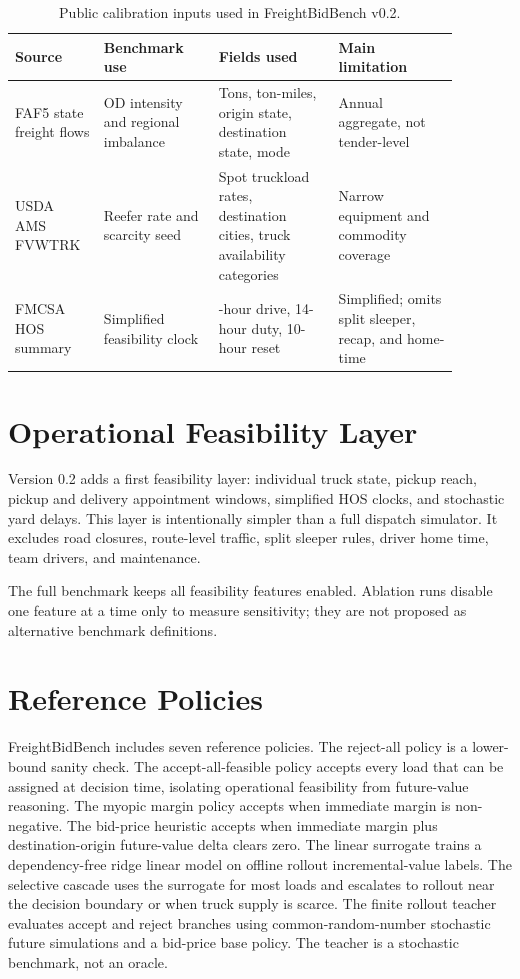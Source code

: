 \documentclass[11pt]{article}
\begin{document}
\begin{table}[t]
\centering
\caption{Public calibration inputs used in FreightBidBench v0.2.}
\begin{tabular}{>{\raggedright\arraybackslash}p{0.17\linewidth}
                >{\raggedright\arraybackslash}p{0.23\linewidth}
                >{\raggedright\arraybackslash}p{0.24\linewidth}
                >{\raggedright\arraybackslash}p{0.24\linewidth}}
\toprule
Source & Benchmark use & Fields used & Main limitation \\
\midrule
FAF5 state freight flows & OD intensity and regional imbalance & Tons,
ton-miles, origin state, destination state, mode & Annual aggregate, not
tender-level \\
USDA AMS FVWTRK & Reefer rate and scarcity seed & Spot truckload rates,
destination cities, truck availability categories & Narrow equipment and
commodity coverage \\
FMCSA HOS summary & Simplified feasibility clock & 11-hour drive, 14-hour
duty, 10-hour reset & Simplified; omits split sleeper, recap, and home-time \\
\bottomrule
\end{tabular}
\label{tab:calibration}
\end{table}

\section{Operational Feasibility Layer}

Version 0.2 adds a first feasibility layer: individual truck state, pickup
reach, pickup and delivery appointment windows, simplified HOS clocks, and
stochastic yard delays. This layer is intentionally simpler than a full dispatch
simulator. It excludes road closures, route-level traffic, split sleeper rules,
driver home time, team drivers, and maintenance.

The full benchmark keeps all feasibility features enabled. Ablation runs disable
one feature at a time only to measure sensitivity; they are not proposed as
alternative benchmark definitions.

\section{Reference Policies}

FreightBidBench includes seven reference policies. The reject-all policy is a
lower-bound sanity check. The accept-all-feasible policy accepts every load
that can be assigned at decision time, isolating operational feasibility from
future-value reasoning. The myopic margin policy accepts when immediate margin
is non-negative. The bid-price heuristic accepts when immediate margin plus
destination-origin future-value delta clears zero. The linear surrogate trains
a dependency-free ridge linear model on offline rollout incremental-value
labels. The selective cascade uses the surrogate for most loads and escalates
to rollout near the decision boundary or when truck supply is scarce. The
finite rollout teacher evaluates accept and reject branches using
common-random-number stochastic future simulations and a bid-price base policy.
The teacher is a stochastic benchmark, not an oracle.
\end{document}
